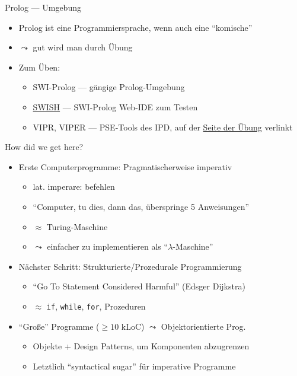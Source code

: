 \documentclass{beamer}
\begin{document}
\begin{frame}{Prolog --- Umgebung}
	\begin{itemize}
		\item Prolog ist eine Programmiersprache, wenn auch eine \enquote{komische}
		\item $\leadsto$ gut wird man durch Übung
		\item Zum Üben:
		\begin{itemize}
			\item SWI-Prolog --- gängige Prolog-Umgebung
			\item \href{https://swish.swi-prolog.org/}{SWISH} --- SWI-Prolog Web-IDE zum Testen
			\item VIPR, VIPER --- PSE-Tools des IPD, auf der \href{https://pp.ipd.kit.edu/lehre/WS201920/paradigmen/uebung/}{Seite der Übung} verlinkt
		\end{itemize}
	\end{itemize}
\end{frame}

\begin{frame}{How did we get here?}
	\begin{itemize}
		\item Erste Computerprogramme: Pragmatischerweise imperativ
		\begin{itemize}
			\item lat. imperare: befehlen
			\item \enquote{Computer, tu dies, dann das, überspringe 5 Anweisungen}
			\item $\approx$ Turing-Maschine
			\item $\leadsto$ einfacher zu implementieren als \enquote{$\lambda$-Maschine}
		\end{itemize}
		\item Nächster Schritt: Strukturierte/Prozedurale Programmierung
		\begin{itemize}
			\item \enquote{Go To Statement Considered Harmful} (Edsger Dijkstra)
			\item $\approx$ \texttt{if}, \texttt{while}, \texttt{for}, Prozeduren
		\end{itemize}
	\item \enquote{Große} Programme ($\geq 10$ kLoC) $\leadsto$ Objektorientierte Prog.
		\begin{itemize}
			\item Objekte + Design Patterns, um Komponenten abzugrenzen
			\item Letztlich \enquote{syntactical sugar} für imperative Programme
		\end{itemize}
	\end{itemize}
\end{frame}
\end{document}
